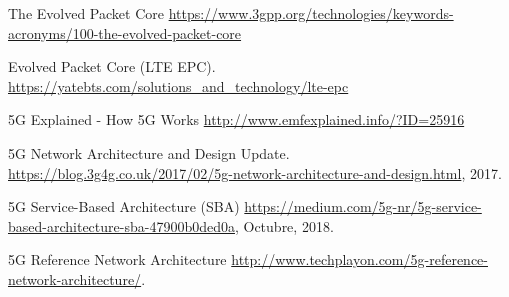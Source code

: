 \begin{thebibliography}{9}
The Evolved Packet Core \href{https://www.3gpp.org/technologies/keywords-acronyms/100-the-evolved-packet-core}{https://www.3gpp.org/technologies/keywords-acronyms/100-the-evolved-packet-core}


Evolved Packet Core (LTE EPC). \href{https://yatebts.com/solutions\_and\_technology/lte-epc}{https://yatebts.com/solutions\_and\_technology/lte-epc}

5G Explained - How 5G Works  \href{http://www.emfexplained.info/?ID=25916}{http://www.emfexplained.info/?ID=25916}

5G Network Architecture and Design Update. \href{https://blog.3g4g.co.uk/2017/02/5g-network-architecture-and-design.html}{https://blog.3g4g.co.uk/2017/02/5g-network-architecture-and-design.html}, 2017.

5G Service-Based Architecture (SBA) \href{https://medium.com/5g-nr/5g-service-based-architecture-sba-47900b0ded0a}{https://medium.com/5g-nr/5g-service-based-architecture-sba-47900b0ded0a}, Octubre, 2018.

5G Reference Network Architecture \href{http://www.techplayon.com/5g-reference-network-architecture/}{http://www.techplayon.com/5g-reference-network-architecture/}.

\end{thebibliography}

